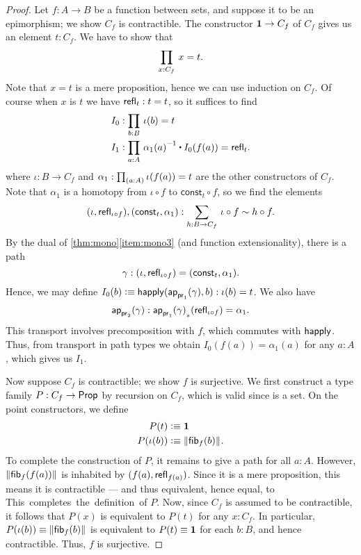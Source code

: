 \begin{proof}
Let $f:A\to B$ be a function between sets, and suppose it to be an epimorphism; we show $C_f$ is contractible.
The constructor $\mathbf{1}\to C_f$ of $C_f$ gives us an element $t:C_f$.
We have to show that
\begin{equation*}
\prd{x:C_f} x= t.
\end{equation*}
Note that $x= t$ is a mere proposition, hence we can use induction on $C_f$.
Of course when $x$ is $t$ we have $\mathsf{refl}_{t}:t=t$, so it suffices to find
\begin{align*}
I_0 & : \prd{b:B} \iota(b)= t\\
I_1 & : \prd{a:A} \opp{\alpha_1(a)} \ct I_0(f(a))=\refl{t}.
\end{align*}
where $\iota:B\to C_f$ and $\alpha_1:\prd{a:A} \iota(f(a))= t$ are the other constructors
of $C_f$. Note that $\alpha_1$ is a homotopy from $\iota\circ f$ to
$\mathsf{const}_t\circ f$, so we find the elements
\begin{equation*}
\pairr{\iota,\refl{\iota\circ f}},\pairr{\mathsf{const}_t,\alpha_1}:
\sm{h:B\to C_f} \iota\circ f \htpy h\circ f.
\end{equation*}
By the dual of \autoref{thm:mono}\ref{item:mono3} (and function extensionality), there is a path
\begin{equation*}
\gamma:{\mathopen{}(\iota,\mathsf{refl}_{\iota\circ f})\mathclose{}}={\mathopen{}(\mathsf{const}_t,\alpha_1)\mathclose{}}.
\end{equation*}
Hence, we may define $I_0(b)\vcentcolon\equiv \mathsf{happly}(\mathsf{ap}_{\mathsf{pr}_{1}}(\gamma),b):\iota(b)=t$.
We also have
\[\mathsf{ap}_{\mathsf{pr}_{2}}(\gamma) : {\mathsf{ap}_{\mathsf{pr}_{1}}(\gamma)}_{*}\mathopen{}\left({\mathsf{refl}_{\iota\circ f}}\right)\mathclose{} = \alpha_1. \]
This transport involves precomposition with $f$, which commutes with $\mathsf{happly}$.
Thus, from transport in path types we obtain $I_0(f(a)) = \alpha_1(a)$ for any $a:A$, which gives us $I_1$.

Now suppose $C_f$ is contractible; we show $f$ is surjective.
We first construct a type family $P:C_f\to\mathsf{Prop}$ by recursion on $C_f$, which is valid since \prop is a set.
On the point constructors, we define
\begin{align*}
P(t) & \vcentcolon\equiv \mathbf{1}\\
P(\iota(b)) & \vcentcolon\equiv \mathopen{}\left\Vert {\mathsf{fib}}_{f}(b)\right\Vert_{}\mathclose{}.
\end{align*}
To complete the construction of $P$, it remains to give a path
for all $a:A$.
However, $\mathopen{}\left\Vert {\mathsf{fib}}_{f}(f(a))\right\Vert_{}\mathclose{}$ is inhabited by $(f(a),\mathsf{refl}_{f(a)})$.
Since it is a mere proposition, this means it is contractible --- and thus equivalent, hence equal, to \unit.
This completes the definition of $P$.
Now, since $C_f$ is assumed to be contractible, it follows that $P(x)$ is equivalent to $P(t)$ for any $x:C_f$.
In particular, $P(\iota(b))\equiv \mathopen{}\left\Vert {\mathsf{fib}}_{f}(b)\right\Vert_{}\mathclose{}$ is equivalent to $P(t)\equiv \mathbf{1}$ for each $b:B$, and hence contractible.
Thus, $f$ is surjective.


\end{proof}
